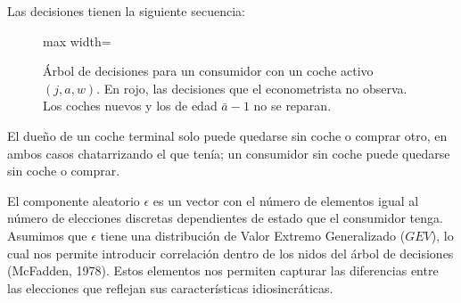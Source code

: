 \documentclass{article}
\begin{document}
Las decisiones tienen la siguiente secuencia:

\begin{figure}[htbp]
\centering
\begin{adjustbox}{max width=\textwidth}
\end{adjustbox}
\caption{Árbol de decisiones para un consumidor con un coche activo $(j,a,w)$. En rojo, las decisiones que el econometrista no observa. Los coches nuevos y los de edad $\bar{a}-1$ no se reparan.}
\label{fig:decision-tree}
\end{figure}

El dueño de un coche terminal solo puede quedarse sin coche o comprar otro, en ambos casos chatarrizando el que tenía; un consumidor sin coche puede quedarse sin coche o comprar.

El componente aleatorio $\epsilon$ es un vector con el número de elementos igual al número de elecciones discretas dependientes de estado que el consumidor tenga. Asumimos que $\epsilon$ tiene una distribución de Valor Extremo Generalizado ($GEV$), lo cual nos permite introducir correlación dentro de los nidos del árbol de decisiones (McFadden, 1978). Estos elementos nos permiten capturar las diferencias entre las elecciones que reflejan sus características idiosincráticas.
\end{document}
